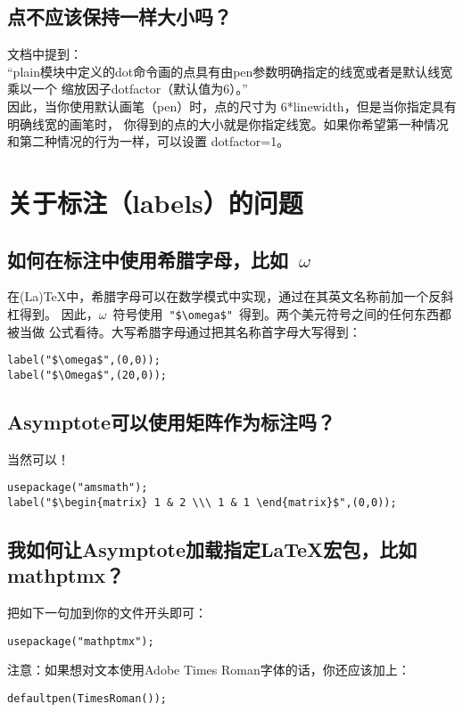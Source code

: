 \subsection{\label{Q3.2}点不应该保持一样大小吗？}
文档中提到：\\
“plain模块中定义的dot命令画的点具有由pen参数明确指定的线宽或者是默认线宽乘以一个
缩放因子dotfactor（默认值为6）。”\\
因此，当你使用默认画笔（pen）时，点的尺寸为 6*linewidth，但是当你指定具有明确线宽的画笔时，
你得到的点的大小就是你指定线宽。如果你希望第一种情况和第二种情况的行为一样，可以设置 dotfactor=1。

\section{\label{Q4}关于标注（labels）的问题}
\subsection{\label{Q4.1}如何在标注中使用希腊字母，比如~$\omega$}
在(La)TeX中，希腊字母可以在数学模式中实现，通过在其英文名称前加一个反斜杠得到。
因此，$\omega$~符号使用~\verb|"$\omega$"|~得到。两个美元符号之间的任何东西都被当做
公式看待。大写希腊字母通过把其名称首字母大写得到：\\
\begin{lstlisting}
label("$\omega$",(0,0));
label("$\Omega$",(20,0));
\end{lstlisting}

\subsection{\label{Q4.2}Asymptote可以使用矩阵作为标注吗？}
当然可以！
\begin{lstlisting}
usepackage("amsmath");
label("$\begin{matrix} 1 & 2 \\\ 1 & 1 \end{matrix}$",(0,0));
\end{lstlisting}

\subsection{\label{Q4.3}我如何让Asymptote加载指定LaTeX宏包，比如mathptmx？}
把如下一句加到你的文件开头即可：
\begin{lstlisting}
usepackage("mathptmx");
\end{lstlisting}
注意：如果想对文本使用Adobe Times Roman字体的话，你还应该加上：
\begin{lstlisting}
defaultpen(TimesRoman());
\end{lstlisting}

